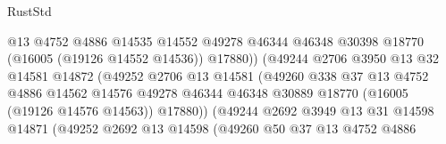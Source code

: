 \begin{lexlean}{RustStd}
\begin{coremodule}
                                        @13
                                        @4752
                                        @4886
                                        @14535
                                        @14552
                                        @49278
                                        @46344
                                        @46348
                                        @30398
                                        @18770
                                        (@16005 (@19126 @14552 @14536))
                                        @17880))
                                    (@49244
                                      @2706
                                      @3950
                                      @13
                                      @32
                                      @14581
                                      @14872
                                      (@49252
                                        @2706
                                        @13
                                        @14581
                                        (@49260
                                          @338
                                          @37
                                          @13
                                          @4752
                                          @4886
                                          @14562
                                          @14576
                                          @49278
                                          @46344
                                          @46348
                                          @30889
                                          @18770
                                          (@16005 (@19126 @14576 @14563))
                                          @17880))
                                      (@49244
                                        @2692
                                        @3949
                                        @13
                                        @31
                                        @14598
                                        @14871
                                        (@49252
                                          @2692
                                          @13
                                          @14598
                                          (@49260
                                            @50
                                            @37
                                            @13
                                            @4752
                                            @4886

\end{coremodule}
\end{lexlean}
